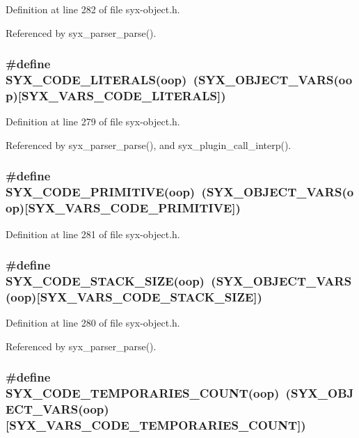 Definition at line 282 of file syx-object.h.

Referenced by syx\_\-parser\_\-parse().\hypertarget{syx-object_8h_b1a48ee5d3b0c5e48a11450c343a0f29}{
\subsubsection{\setlength{\rightskip}{0pt plus 5cm}\#define SYX\_\-CODE\_\-LITERALS(oop)~(SYX\_\-OBJECT\_\-VARS(oop)\mbox{[}SYX\_\-VARS\_\-CODE\_\-LITERALS\mbox{]})}}
\label{syx-object_8h_b1a48ee5d3b0c5e48a11450c343a0f29}




Definition at line 279 of file syx-object.h.

Referenced by syx\_\-parser\_\-parse(), and syx\_\-plugin\_\-call\_\-interp().\hypertarget{syx-object_8h_8e1e73926a6cccc562a3888f4fdf84a8}{
\subsubsection{\setlength{\rightskip}{0pt plus 5cm}\#define SYX\_\-CODE\_\-PRIMITIVE(oop)~(SYX\_\-OBJECT\_\-VARS(oop)\mbox{[}SYX\_\-VARS\_\-CODE\_\-PRIMITIVE\mbox{]})}}
\label{syx-object_8h_8e1e73926a6cccc562a3888f4fdf84a8}




Definition at line 281 of file syx-object.h.\hypertarget{syx-object_8h_11c316115d1fc6959e463779cc7b42df}{
\subsubsection{\setlength{\rightskip}{0pt plus 5cm}\#define SYX\_\-CODE\_\-STACK\_\-SIZE(oop)~(SYX\_\-OBJECT\_\-VARS(oop)\mbox{[}SYX\_\-VARS\_\-CODE\_\-STACK\_\-SIZE\mbox{]})}}
\label{syx-object_8h_11c316115d1fc6959e463779cc7b42df}




Definition at line 280 of file syx-object.h.

Referenced by syx\_\-parser\_\-parse().\hypertarget{syx-object_8h_4acfab65c2c72d409325dc662d34dc5b}{
\subsubsection{\setlength{\rightskip}{0pt plus 5cm}\#define SYX\_\-CODE\_\-TEMPORARIES\_\-COUNT(oop)~(SYX\_\-OBJECT\_\-VARS(oop)\mbox{[}SYX\_\-VARS\_\-CODE\_\-TEMPORARIES\_\-COUNT\mbox{]})}}
\label{syx-object_8h_4acfab65c2c72d409325dc662d34dc5b}




